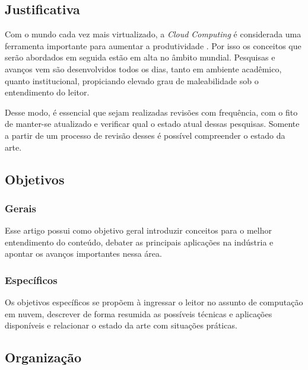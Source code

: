 \documentclass[12pt]{article}
\begin{document}
\subsection{Justificativa}

Com o mundo cada vez mais virtualizado, a \emph{Cloud Computing} é considerada uma ferramenta importante para aumentar a produtividade \cite{loos}. Por isso os conceitos que serão abordados em seguida estão em alta no âmbito mundial. Pesquisas e avanços vem são desenvolvidos todos os dias, tanto em ambiente acadêmico, quanto institucional, propiciando elevado grau de maleabilidade sob o entendimento do leitor.

Desse modo, é essencial que sejam realizadas revisões com frequência, com o fito de manter-se atualizado e verificar qual o estado atual dessas pesquisas. Somente a partir de um processo de revisão desses é possível compreender o estado da arte.

\subsection{Objetivos}

\subsubsection{Gerais}
Esse artigo possui como objetivo geral introduzir conceitos para o melhor entendimento do conteúdo, debater as principais aplicações na indústria e apontar os avanços importantes nessa área.

\subsubsection{Específicos}
Os objetivos específicos se propõem à ingressar o leitor no assunto de computação em nuvem, descrever de forma resumida as possíveis técnicas e aplicações disponíveis e relacionar o estado da arte com situações práticas.

\subsection{Organização}
\end{document}
